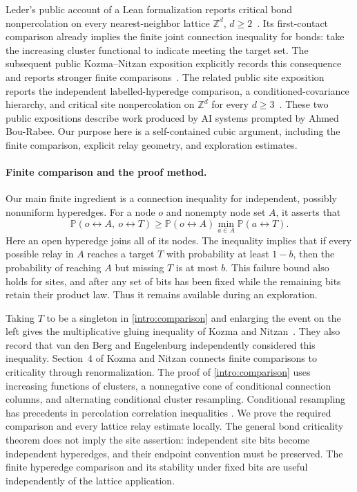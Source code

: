 \documentclass[11pt]{article}
\theoremstyle{definition}
\theoremstyle{remark}
\numberwithin{equation}{section}
\begin{document}
Leder's public account of a Lean formalization reports critical bond
nonpercolation on every nearest-neighbor lattice $\mathbb Z^d$,
$d\ge2$~\cite{Leder2026}. Its first-contact comparison
\cite[Section~3.4, (GEN)]{Leder2026} already implies the finite joint connection inequality for
bonds: take the increasing cluster functional to indicate meeting the
target set. The subsequent public Kozma--Nitzan exposition explicitly
records this consequence and reports stronger finite
comparisons~\cite[``Conjecture~1 from the Lean proof of Conjecture~3'']{KNPublic2026}.
The related public site exposition reports the
independent labelled-hyperedge comparison, a conditioned-covariance
hierarchy, and critical site nonpercolation on $\mathbb Z^d$ for every
$d\ge3$~\cite[``One inequality for both models'',
``Conditional covariance inequalities'', and ``From (1) to the lattice'']{SitePublic2026}.
These two public expositions describe work produced by AI systems
prompted by Ahmed Bou-Rabee. Our purpose here is a
self-contained cubic argument, including the finite comparison, explicit
relay geometry, and exploration estimates.

\paragraph{Finite comparison and the proof method.}
Our main finite ingredient is a connection inequality for independent,
possibly nonuniform hyperedges. For a node $o$ and nonempty node set $A$,
it asserts that
\begin{equation}\label{intro:comparison}
 \mathbb P(o\leftrightarrow A,\ o\leftrightarrow T)
 \ge \mathbb P(o\leftrightarrow A)
          \min_{a\in A}\mathbb P(a\leftrightarrow T).
\end{equation}
Here an open hyperedge joins all of its nodes. The inequality implies that
if every possible relay in $A$ reaches a target $T$ with probability at
least $1-b$, then the probability of reaching $A$ but missing $T$ is at
most $b$. This failure bound also holds for sites, and after any set of bits
has been fixed while the remaining bits retain their product law. Thus it
remains available during an exploration.

Taking $T$ to be a singleton in \eqref{intro:comparison} and enlarging
the event on the left gives the multiplicative gluing inequality of
Kozma and Nitzan~\cite[Conjecture~1]{KozmaNitzan2024}.
They also record that van den Berg and Engelenburg independently
considered this inequality. Section~4 of Kozma and Nitzan connects finite comparisons
to criticality through renormalization. The proof of
\eqref{intro:comparison} uses increasing functions of clusters, a
nonnegative cone of conditional connection columns, and alternating
conditional cluster resampling. Conditional resampling has precedents in
percolation correlation inequalities \cite[Section~2.1]{BHK2006}.
We prove the required comparison and every lattice relay estimate locally.
The general bond criticality theorem does not imply the site assertion:
independent site bits become independent hyperedges, and their endpoint
convention must be preserved. The finite hyperedge comparison
and its stability under fixed bits are useful independently of the lattice
application.
\end{document}
